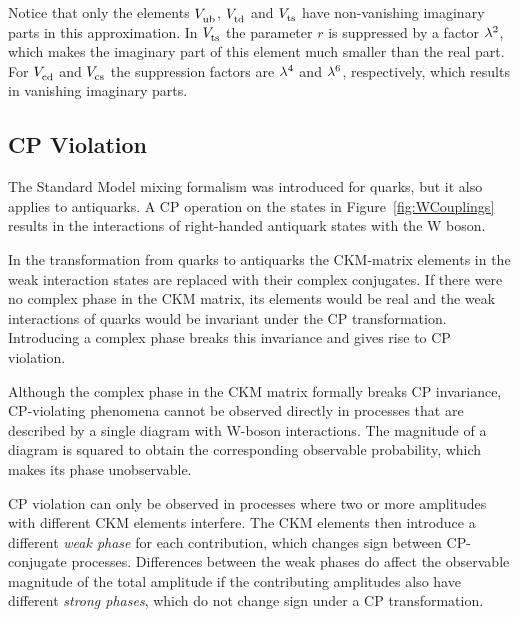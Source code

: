 Notice that only the elements $\Vub$, $\Vtd$ and $\Vts$ have non-vanishing imaginary parts in this approximation. In $\Vts$ the parameter $r$ is suppressed by a
factor $\lambda^2$, which makes the imaginary part of this element much smaller than the real part. For $\Vcd$ and $\Vcs$ the suppression
factors are $\lambda^4$ and $\lambda^6$, respectively, which results in vanishing imaginary parts.


\subsection{CP Violation}
\label{subsec:intro_mixCPV_CPV}

The Standard Model mixing formalism was introduced for quarks, but it also applies to antiquarks. A CP operation on the states in
Figure~\ref{fig:WCouplings} results in the interactions of right-handed antiquark states with the W boson.

In the transformation from quarks to antiquarks the CKM-matrix elements in the weak interaction states are replaced with their complex
conjugates. If there were no complex phase in the CKM matrix, its elements would be real and the weak interactions of quarks would be
invariant under the CP transformation. Introducing a complex phase breaks this invariance and gives rise to CP violation.

Although the complex phase in the CKM matrix formally breaks CP invariance, CP-violating phenomena cannot be observed directly in processes
that are described by a single diagram with W-boson interactions. The magnitude of a diagram is squared to obtain the corresponding
observable probability, which makes its phase unobservable.

CP violation can only be observed in processes where two or more amplitudes with different CKM elements interfere. The CKM elements then
introduce a different \emph{weak phase} for each contribution, which changes sign between CP-conjugate processes. Differences between the
weak phases do affect the observable magnitude of the total amplitude if the contributing amplitudes also have different \emph{strong
phases}, which do not change sign under a CP transformation.

